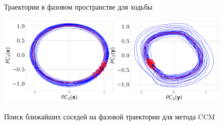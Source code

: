 \documentclass[12pt]{extarticle}
\begin{document}
\begin{figure}[h!]
\centering
   \hspace{0.5cm}
  \\
\caption{Траектории в фазовом пространстве для ходьбы}
\label{fg:initial_traj}
\end{figure}


\begin{figure}[h!]
\centering
{\includegraphics[width=1\textwidth]{./images/knn-2.png}}
\caption{Поиск ближайших соседей на фазовой траектории для метода CCM}
\label{fg:CCM}
\end{figure}
\end{document}
